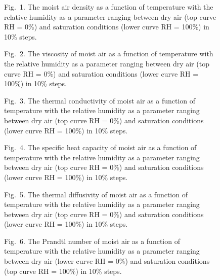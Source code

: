\documentclass[11pt]{article}
\begin{document}
\begin{figure}[htbp]\centering
\caption*{Fig.~1. The moist air density as a function of temperature
with the relative humidity as a parameter ranging between dry air
(top curve RH = 0\%) and saturation conditions (lower curve
RH = 100\%) in 10\% steps.}
\end{figure}

\begin{figure}[htbp]\centering
\caption*{Fig.~2. The viscosity of moist air as a function of
temperature with the relative humidity as a parameter ranging between
dry air (top curve RH = 0\%) and saturation conditions (lower curve
RH = 100\%) in 10\% steps.}
\end{figure}

\begin{figure}[htbp]\centering
\caption*{Fig.~3. The thermal conductivity of moist air as a function
of temperature with the relative humidity as a parameter ranging
between dry air (top curve RH = 0\%) and saturation conditions (lower
curve RH = 100\%) in 10\% steps.}
\end{figure}

\begin{figure}[htbp]\centering
\caption*{Fig.~4. The specific heat capacity of moist air as a function
of temperature with the relative humidity as a parameter ranging
between dry air (top curve RH = 0\%) and saturation conditions (lower
curve RH = 100\%) in 10\% steps.}
\end{figure}

\begin{figure}[htbp]\centering
\caption*{Fig.~5. The thermal diffusivity of moist air as a function of
temperature with the relative humidity as a parameter ranging between
dry air (top curve RH = 0\%) and saturation conditions (lower curve
RH = 100\%) in 10\% steps.}
\end{figure}

\begin{figure}[htbp]\centering
\caption*{Fig.~6. The Prandtl number of moist air as a function of
temperature with the relative humidity as a parameter ranging between
dry air (lower curve RH = 0\%) and saturation conditions (top curve
RH = 100\%) in 10\% steps.}
\end{figure}
\end{document}
